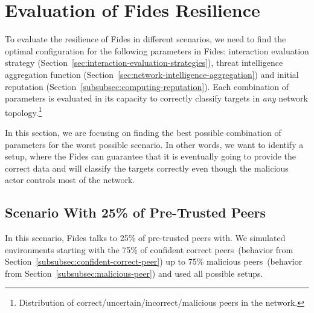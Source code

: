 \section{Evaluation of Fides Resilience}
\label{sec:fides-resilience}

To evaluate the resilience of Fides in different scenarios, we need to find the optimal configuration for the following parameters in Fides: interaction evaluation strategy (Section~\ref{sec:interaction-evaluation-strategies}), threat intelligence aggregation function (Section~\ref{sec:network-intelligence-aggregation}) and initial reputation (Section~\ref{subsubsec:computing-reputation}). Each combination of parameters is evaluated in its capacity to correctly classify targets in \textit{any} network topology.\footnote{Distribution of correct/uncertain/incorrect/malicious peers in the network.}

In this section, we are focusing on finding the best possible combination of parameters for the worst possible scenario. In other words, we want to identify a setup, where the Fides can guarantee that it is eventually going to provide the correct data and will classify the targets correctly even though the malicious actor controls most of the network.


\subsection{Scenario With 25\% of Pre-Trusted Peers}
\label{subsec:scenario-with-25-pretrusted-peers}

In this scenario, Fides talks to 25\% of pre-trusted peers with. We simulated environments starting with the 75\% of confident correct peers~(behavior from Section~\ref{subsubsec:confident-correct-peer}) up to 75\% malicious peers~(behavior from Section~\ref{subsubsec:malicious-peer}) and used all possible setups.

